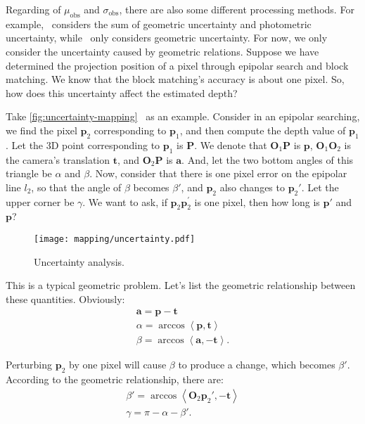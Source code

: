 Regarding of $\mu_{\mathrm{obs}}$ and $\sigma_{\mathrm{obs}}$, there are also some different processing methods. For example,~\cite{Engel2013} considers the sum of geometric uncertainty and photometric uncertainty, while~\cite{Vogiatzis2011} only considers geometric uncertainty. For now, we only consider the uncertainty caused by geometric relations. Suppose we have determined the projection position of a pixel through epipolar search and block matching. We know that the block matching's accuracy is about one pixel. So, how does this uncertainty affect the estimated depth?

Take \autoref{fig:uncertainty-mapping}~ as an example. Consider in an epipolar searching, we find the pixel $\mathbf{p}_2$ corresponding to $\mathbf{p}_1$, and then compute the depth value of $\mathbf{p}_1$. Let the 3D point corresponding to $\mathbf{ p}_1$ is $\mathbf{P}$. We denote that $\mathbf{O}_1 \mathbf{P}$ is $\mathbf{p}$, $\mathbf{O}_1 \mathbf{O}_2$ is the camera's translation $\mathbf{t} $, and $\mathbf{O}_2 \mathbf{P}$ is $\mathbf{a}$. And, let the two bottom angles of this triangle be $\alpha$ and $\beta$. Now, consider that there is one pixel error on the epipolar line $l_2$, so that the angle of $\beta$ becomes $\beta'$, and $\mathbf{p}_2$ also changes to $\mathbf{p }_2'$. Let the upper corner be $\gamma$. We want to ask, if $\mathbf{p}_2 \mathbf{p}_2^\prime $ is one pixel, then how long is $\mathbf{p}'$ and $\mathbf{p}$?

\begin{figure}[!ht]
	\centering
	\texttt{[image: mapping/uncertainty.pdf]}
	\caption{Uncertainty analysis.}
	\label{fig:uncertainty-mapping}
\end{figure}

This is a typical geometric problem. Let's list the geometric relationship between these quantities. Obviously:
\begin{equation}
	\begin{array}{l}
		\mathbf{a} = \mathbf{p} - \mathbf{t} \\
		\alpha  = \arccos \left\langle {\mathbf{p}, \mathbf{t}} \right\rangle \\
		\beta  = \arccos \left\langle {\mathbf{a}, - \mathbf{t}} \right\rangle .
	\end{array}
\end{equation}

Perturbing $\mathbf{p}_2$ by one pixel will cause $\beta$ to produce a change, which becomes $\beta'$. According to the geometric relationship, there are:
\begin{equation}
	\begin{array}{l}
		\beta ' = \arccos \left\langle {\mathbf{O}_2 \mathbf{p}_2', -\mathbf{t}} \right\rangle \\
		\gamma  = \pi  - \alpha  - \beta '.
	\end{array}
\end{equation}

